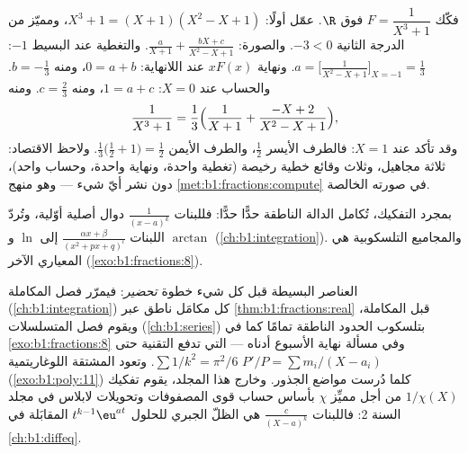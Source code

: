 \begin{example}\label{ex:b1:fractions:cubic}
فكّك $F = \dfrac{1}{X^3 + 1}$ فوق $\R$. عمّل أولًا: $X^3 +
1 = (X + 1)(X^2 - X + 1)$، ومميّز  من الدرجة الثانية $-3 <
0$. والصورة: $\frac{a}{X+1} + \frac{bX + c}{X^2 - X + 1}$. والتغطية
عند  البسيط $-1$: $a = \bigl[\frac1{X^2 - X +
1}\bigr]_{X=-1} = \frac13$. ونهاية $xF(x)$ عند اللانهاية: $0 = a +
b$، ومنه $b = -\frac13$. والحساب عند $X = 0$: $1 = a + c$، ومنه $c =
\frac23$. ومنه
\[
\frac{1}{X^3+1} = \frac13\Bigl(\frac{1}{X+1}
+ \frac{-X + 2}{X^2 - X + 1}\Bigr) ,
\]
وقد تأكد عند $X = 1$: فالطرف الأيسر $\frac12$، والطرف الأيمن
$\frac13\bigl(\frac12 + 1\bigr) = \frac12$. ولاحظ الاقتصاد:
ثلاثة مجاهيل، وثلاث وقائع خطية رخيصة (تغطية واحدة، ونهاية
واحدة، وحساب واحد)، دون نشر أيّ شيء --- وهو منهج
\cref{met:b1:fractions:compute} في صورته الخالصة.
\end{example}

\begin{remark}
بمجرد التفكيك، تُكامل الدالة الناطقة حدًّا حدًّا: فللبنات
$\frac{1}{(x-a)^k}$ دوال أصلية أوّلية، وتُردّ اللبنات
$\frac{\alpha x + \beta}{(x^2 + px + q)^l}$ إلى $\ln$ و
$\arctan$ (\cref{ch:b1:integration}). والمجاميع التلسكوبية هي 
المعياري الآخر (\cref{exo:b1:fractions:8}).
\end{remark}

\begin{remark}\label{rem:b1:fractions:whereused}
العناصر البسيطة قبل كل شيء خطوة \emph{تحضير}: فيمرّر
فصل المكاملة (\cref{ch:b1:integration}) كل مكامَل ناطق
عبر \cref{thm:b1:fractions:real} قبل المكاملة،
ويقوم فصل المتسلسلات (\cref{ch:b1:series}) بتلسكوب الحدود
الناطقة تمامًا كما في \cref{exo:b1:fractions:8} وفي مسألة نهاية
الأسبوع أدناه --- التي تدفع التقنية حتى
$\sum 1/k^2 = \pi^2/6$. وتعود المشتقة اللوغاريتمية $P'/P = \sum
m_i/(X - a_i)$ (\cref{exo:b1:poly:11}) كلما دُرست مواضع
الجذور. وخارج هذا المجلد، يقوم تفكيك
$1/\chi(X)$ من أجل  مميِّز $\chi$ بأساس
حساب قوى المصفوفات وتحويلات لابلاس في مجلد السنة
2: فاللبنات $\frac{c}{(X - a)^k}$ هي الظلّ الجبري
للحلول $t^{k-1}\eu^{at}$ المقابَلة في \cref{ch:b1:diffeq}.
\end{remark}

